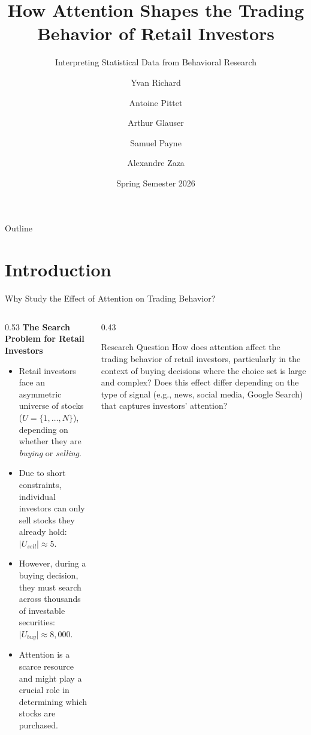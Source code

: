 \documentclass[aspectratio=169, 10pt]{beamer}
\title{How Attention Shapes the Trading Behavior of Retail Investors}
\subtitle{Interpreting Statistical Data from Behavioral Research}
\author[Y.\ Richard \& A.\ Pittet \& A.\ Glauser \& S.\ Payne \& A.\ Zaza]{Yvan Richard \and Antoine Pittet \and Arthur Glauser \and Samuel Payne \and Alexandre Zaza}
\institute[HSG]{University of St.\ Gallen}
\date{Spring Semester 2026}
\begin{document}

\begin{frame}[plain]
  \titlepage
\end{frame}

\begin{frame}{Outline}
  \tableofcontents
\end{frame}

\section{Introduction}

\begin{frame}{Why Study the Effect of Attention on Trading Behavior?}
  \begin{columns}[T]
    \begin{column}{0.53\textwidth}
      \textbf{The Search Problem for Retail Investors}
      \vspace{0.5em}
      \begin{itemize}
        \setlength\itemsep{0.5em}
        \item Retail investors face an asymmetric universe of stocks ($U = \{1, \dots, N\}$), depending on whether they are \emph{buying} or \emph{selling}.
        \item Due to short constraints, individual investors can only sell stocks they already hold: $\mid U_{sell} \mid \approx 5$.
        \item However, during a buying decision, they must search across \alert{thousands} of investable securities: $\mid U_{buy} \mid \approx 8,000$.
        \item Attention is a scarce resource and might play a crucial role in determining which stocks are purchased.
      \end{itemize}
    \end{column}
    \begin{column}{0.43\textwidth}
      \begin{block}{Research Question}
        How does attention affect the trading behavior of retail investors, particularly in
        the context of buying decisions where the choice set is large and complex? Does this effect
        differ depending on the type of signal (e.g., news, social media, Google Search) that captures investors' attention?
      \end{block}
    \end{column}
  \end{columns}
\end{frame}
\end{document}
